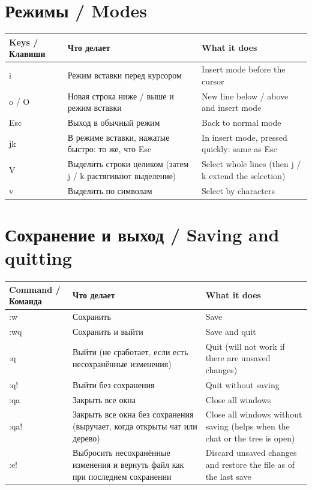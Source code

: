 \documentclass[10pt]{article}
\newcommand{\hdr}[3]{\toprule \textbf{#1} & \textbf{#2} & \textbf{#3} \\ \midrule \endhead}
\begin{document}
\section*{Режимы / Modes}
\begin{longtable}{@{}K A B@{}}
\hdr{Keys / Клавиши}{Что делает}{What it does}
i & Режим вставки перед курсором & Insert mode before the cursor \\
o / O & Новая строка ниже / выше и режим вставки & New line below / above and insert mode \\
Esc & Выход в обычный режим & Back to normal mode \\
jk & В режиме вставки, нажатые быстро: то же, что Esc & In insert mode, pressed quickly: same as Esc \\
V & Выделить строки целиком (затем j / k растягивают выделение) & Select whole lines (then j / k extend the selection) \\
v & Выделить по символам & Select by characters \\
\end{longtable}

\section*{Сохранение и выход / Saving and quitting}
\begin{longtable}{@{}K A B@{}}
\hdr{Command / Команда}{Что делает}{What it does}
:w & Сохранить & Save \\
:wq & Сохранить и выйти & Save and quit \\
:q & Выйти (не сработает, если есть несохранённые изменения) & Quit (will not work if there are unsaved changes) \\
:q! & Выйти без сохранения & Quit without saving \\
:qa & Закрыть все окна & Close all windows \\
:qa! & Закрыть все окна без сохранения (выручает, когда открыты чат или дерево) & Close all windows without saving (helps when the chat or the tree is open) \\
:e! & Выбросить несохранённые изменения и вернуть файл как при последнем сохранении & Discard unsaved changes and restore the file as of the last save \\
\end{longtable}
\end{document}

